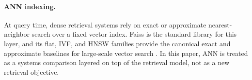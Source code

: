 \paragraph{ANN indexing.}
At query time, dense retrieval systems rely on exact or approximate nearest-neighbor search over a fixed vector index. Faiss is the standard library for this layer, and its flat, IVF, and HNSW families provide the canonical exact and approximate baselines for large-scale vector search \cite{johnson-etal-2021-faiss,malkov-yashunin-2018-hnsw}. In this paper, ANN is treated as a systems comparison layered on top of the retrieval model, not as a new retrieval objective.
